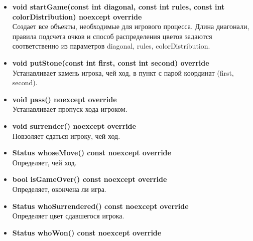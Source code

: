\begin{itemize}

\item\textbf{void startGame(const int diagonal, const int rules, const int colorDistribution) noexcept override}\\
	
	Создает все объекты, необходимые для игрового процесса. Длина диагонали, правила подсчета очков и способ распределения цветов задаются
	соответственно из параметров diagonal, rules, colorDistribution.\\

\item\textbf{void putStone(const int first, const int second) override}\\
	
	Устанавливает камень игрока, чей ход, в пункт с парой координат (first, second).\\


\item\textbf{void pass() noexcept override}\\

	Устанавливает пропуск хода игроком.\\

\item\textbf{void surrender() noexcept override}\\

	Повзоляет сдаться игроку, чей ход.\\

\item\textbf{Status whoseMove() const noexcept override}\\

	Определяет, чей ход.\\

\item\textbf{bool isGameOver() const noexcept override}\\

	Определяет, окончена ли игра.\\

\item\textbf{Status whoSurrendered() const noexcept override}\\

	Определяет цвет сдавшегося игрока.\\

\item\textbf{Status whoWon() const noexcept override}\\


\end{itemize}
